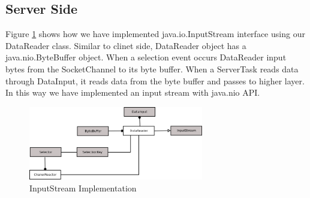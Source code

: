 \subsection{Server Side}
Figure \ref{server} shows how we have implemented java.io.InputStream interface using our DataReader class. Similar to clinet side, DataReader object has a java.nio.ByteBuffer object. When a selection event occurs DataReader input bytes from the SocketChannel to its byte buffer. When a ServerTask reads data through DataInput, it reads data from the byte buffer and passes to higher layer. In this way we have implemented an input stream with java.nio API.
\begin{figure}[!t]
        \centering
        \includegraphics[width=3.0in]{server.png}
        \caption{InputStream Implementation}
        \label{server}
\end{figure}
